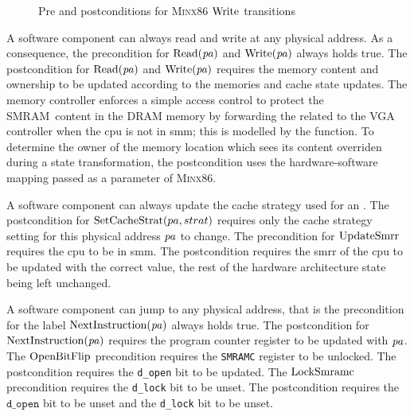 \begin{figure}[p]
{    \begin{prooftree}
    \end{prooftree}
  }

  \caption{Pre and postconditions for {\scshape Minx86} \( \func{Write} \)
    transitions}
  \label{fig:speccert2:softprepost}
\end{figure}

A software component can always read and write at any physical address.
%
As a consequence, the precondition for \( \func{Read}(\var{pa}) \) and
\( \func{Write}(\var{pa}) \) always holds true.
%
The postcondition for \( \func{Read}(\var{pa}) \) and
\( \func{Write}(\var{pa}) \) requires the memory content and ownership to be
updated according to the memories and cache state updates.
%
The memory controller enforces a simple access control to protect the
SMRAM content in the DRAM memory by forwarding the related \IO to the VGA
controller when the \ac{cpu} is not in \ac{smm};
%
this is modelled by the  function.
%
To determine the owner of the memory location which sees its content overriden
during a state transformation, the postcondition uses the hardware-software
mapping passed as a parameter of {\scshape Minx86}.

A software component can always update the cache strategy used for an \IO.
%
The postcondition for \( \func{SetCacheStrat}(pa,strat) \) requires only the
cache strategy setting for this physical address $\var{pa}$ to change.
%
The precondition for \( \func{UpdateSmrr} \) requires the \ac{cpu} to be in
\ac{smm}.
%
The postcondition requires the \ac{smrr} of the \ac{cpu} to be updated with the
correct value, the rest of the hardware architecture state being left unchanged.

A software component can jump to any physical address, that is the precondition
for the label \( \func{NextInstruction}(\var{pa}) \) always holds true.
%
The postcondition for \( \func{NextInstruction}(\var{pa}) \) requires the
program counter register to be updated with \( \var{pa} \).
%
The \( \func{OpenBitFlip} \) precondition requires the \texttt{SMRAMC} register
to be unlocked.
%
The postcondition requires the \texttt{d\_open} bit to be updated. The
$\func{LockSmramc}$ precondition requires the \texttt{d\_lock} bit to be
unset.
%
The postcondition requires the $\texttt{d\_open}$ bit to be unset and the
\texttt{d\_lock} bit to be unset.

